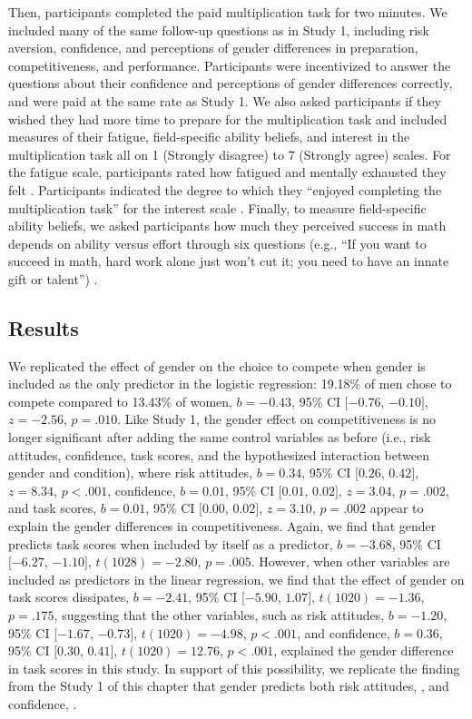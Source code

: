 \documentclass[a4paper,nobind]{templates/ociamthesis}
\begin{document}
Then, participants completed the paid multiplication task for two minutes. We included many of the same follow-up questions as in Study 1, including risk aversion, confidence, and perceptions of gender differences in preparation, competitiveness, and performance. Participants were incentivized to answer the questions about their confidence and perceptions of gender differences correctly, and were paid at the same rate as Study 1. We also asked participants if they wished they had more time to prepare for the multiplication task and included measures of their fatigue, field-specific ability beliefs, and interest in the multiplication task all on 1 (Strongly disagree) to 7 (Strongly agree) scales. For the fatigue scale, participants rated how fatigued and mentally exhausted they felt \autocite{Milyavskaya2018}. Participants indicated the degree to which they ``enjoyed completing the multiplication task'' for the interest scale \autocite{Milyavskaya2018}. Finally, to measure field-specific ability beliefs, we asked participants how much they perceived success in math depends on ability versus effort through six questions (e.g., ``If you want to succeed in math, hard work alone just won't cut it; you need to have an innate gift or talent'') \autocite{Meyer2015}.

\hypertarget{results-1}{%
\subsection{Results}\label{results-1}}

We replicated the effect of gender on the choice to compete when gender is included as the only predictor in the logistic regression: 19.18\% of men chose to compete compared to 13.43\% of women, \(b = -0.43\), 95\% CI \([-0.76\), \(-0.10]\), \(z = -2.56\), \(p = .010\). Like Study 1, the gender effect on competitiveness is no longer significant after adding the same control variables as before (i.e., risk attitudes, confidence, task scores, and the hypothesized interaction between gender and condition), where risk attitudes, \(b = 0.34\), 95\% CI \([0.26\), \(0.42]\), \(z = 8.34\), \(p < .001\), confidence, \(b = 0.01\), 95\% CI \([0.01\), \(0.02]\), \(z = 3.04\), \(p = .002\), and task scores, \(b = 0.01\), 95\% CI \([0.00\), \(0.02]\), \(z = 3.10\), \(p = .002\) appear to explain the gender differences in competitiveness. Again, we find that gender predicts task scores when included by itself as a predictor, \(b = -3.68\), 95\% CI \([-6.27\), \(-1.10]\), \(t(1028) = -2.80\), \(p = .005\). However, when other variables are included as predictors in the linear regression, we find that the effect of gender on task scores dissipates, \(b = -2.41\), 95\% CI \([-5.90\), \(1.07]\), \(t(1020) = -1.36\), \(p = .175\), suggesting that the other variables, such as risk attitudes, \(b = -1.20\), 95\% CI \([-1.67\), \(-0.73]\), \(t(1020) = -4.98\), \(p < .001\), and confidence, \(b = 0.36\), 95\% CI \([0.30\), \(0.41]\), \(t(1020) = 12.76\), \(p < .001\), explained the gender difference in task scores in this study. In support of this possibility, we replicate the finding from the Study 1 of this chapter that gender predicts both risk attitudes, , and confidence, .
\end{document}
